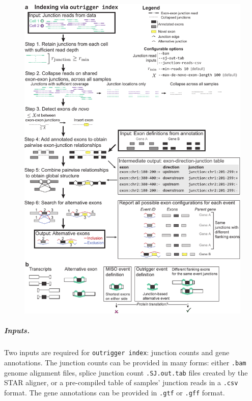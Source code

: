 \clearpage
\begin{figure}[h]
\ContinuedFloat
\captionsetup{labelformat=empty}
\centering
  \includegraphics[width=5.8in]{figures/outrigger_index}
\end{figure}
\clearpage


\subparagraph{Inputs.} Two inputs are required for \texttt{outrigger index}: junction counts and gene annotations. The junction counts can be provided in many forms: either \texttt{.bam} \cite{Group:OEYDIUUE} genome alignment files, splice junction count \texttt{.SJ.out.tab} files created by the STAR aligner\cite{Dobin:2013fg}, or a pre-compiled table of samples' junction reads in a \texttt{.csv} format. The gene annotations can be provided in \texttt{.gtf} or \texttt{.gff} format.

